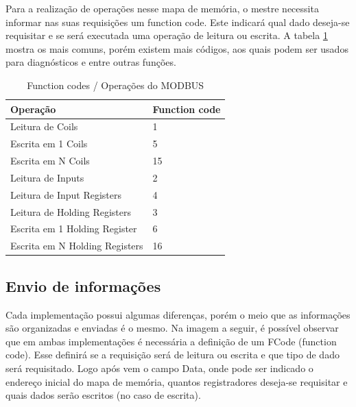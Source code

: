 Para a realização de operações nesse mapa de memória, o mestre necessita informar nas suas requisições um function code. Este indicará qual dado deseja-se requisitar e se será executada uma operação de leitura ou escrita. A tabela \ref{table:modbus-funccodes} mostra os mais comuns, porém existem mais códigos, aos quais podem ser usados para diagnósticos e entre outras funções.

\begin{table}[]
\centering
\caption{Function codes / Operações do MODBUS}
\label{table:modbus-funccodes}
\begin{tabular}{@{}ll@{}}
\toprule
\textbf{Operação}              & \textbf{Function code} \\ \midrule
Leitura de Coils               & 1                      \\
Escrita em 1 Coils             & 5                      \\
Escrita em N Coils             & 15                     \\
Leitura de Inputs              & 2                      \\
Leitura de Input Registers     & 4                      \\
Leitura de Holding Registers   & 3                      \\
Escrita em 1 Holding Register  & 6                      \\
Escrita em N Holding Registers & 16                     \\ \bottomrule
\end{tabular}
\end{table}

\subsection{Envio de informações}

Cada implementação possui algumas diferenças, porém o meio que as informações são organizadas e enviadas é o mesmo. Na imagem a seguir, é possível observar que em ambas implementações é necessária a definição de um FCode (function code). Esse definirá se a requisição será de leitura ou escrita e que tipo de dado será requisitado. Logo após vem o campo Data, onde pode ser indicado o endereço inicial do mapa de memória, quantos registradores deseja-se requisitar e quais dados serão escritos (no caso de escrita).

